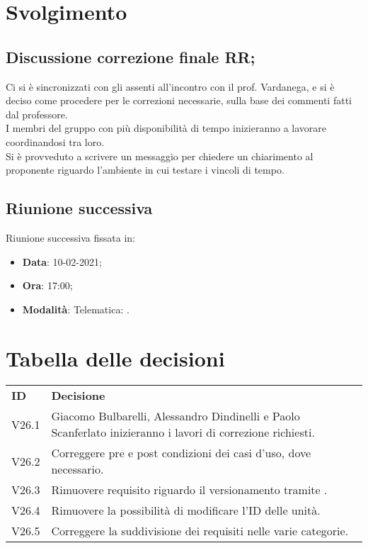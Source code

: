 \documentclass[]{article}
\begin{document}
	\newpage

	\section{Svolgimento}
		\subsection{Discussione correzione finale RR;}
		Ci si è sincronizzati con gli assenti all'incontro con il prof. Vardanega, e si è deciso come procedere per le correzioni necessarie, sulla base dei commenti fatti dal professore. 
		\\
		I membri del gruppo con più disponibilità di tempo inizieranno a lavorare coordinandosi tra loro.\\
		Si è provveduto a scrivere un messaggio per chiedere un chiarimento al proponente riguardo l'ambiente in cui testare i vincoli di tempo.\\
		
		
	\subsection{Riunione successiva}
	Riunione successiva fissata in:
	\begin{itemize}
		\item \textbf{Data}: 10-02-2021;
		\item \textbf{Ora}: 17:00;
		\item \textbf{Modalità}: Telematica: .
	\end{itemize}
		
	\newpage
	
	\section{Tabella delle decisioni}
	
	\begin{table} [h!]
		\begin{center}
			\begin{tabular} { m{2cm} m{14cm} }
				\rowcolor{lightgray}
				\textbf{ID} & \textbf{Decisione}\\
				V26.1 & Giacomo Bulbarelli, Alessandro Dindinelli e Paolo Scanferlato inizieranno i lavori di correzione richiesti.\\
				V26.2 & Correggere pre e post condizioni dei casi d'uso, dove necessario.\\
				V26.3 & Rimuovere requisito riguardo il versionamento tramite \glock{Github}.\\
				V26.4 & Rimuovere la possibilità di modificare l'ID delle unità.\\
				V26.5 & Correggere la suddivisione dei requisiti nelle varie categorie.\\
			\end{tabular}
		\end{center}
	\end{table}
	
\end{document}
